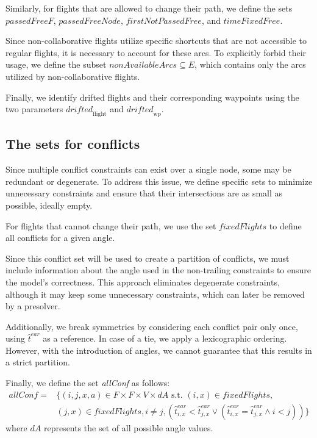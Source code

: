 \documentclass[../thesis.tex]{subfiles}
\begin{document}
Similarly, for flights that are allowed to change their path, we define the sets \( \textit{passedFreeF} \), \( \textit{passedFreeNode} \), \( \textit{firstNotPassedFree} \), and \( \textit{timeFixedFree} \).  

Since non-collaborative flights utilize specific shortcuts that are not accessible to regular flights, it is necessary to account for these arcs. 
To explicitly forbid their usage, we define the subset \( nonAvailableArcs \subseteq E \), which contains only the arcs utilized by non-collaborative flights.


Finally, we identify drifted flights and their corresponding waypoints using the two parameters \( \textit{drifted}_{\text{flight}} \) and \( \textit{drifted}_{\text{wp}} \).  


\subsection{The sets for conflicts}\label{sec:setConflict}

Since multiple conflict constraints can exist over a single node, some may be redundant or degenerate. To address this issue, we define specific sets to minimize unnecessary constraints and ensure that their intersections are as small as possible, ideally empty.

For flights that cannot change their path, we use the set $fixedFlights$ to define all conflicts for a given angle.

Since this conflict set will be used to create a partition of conflicts, we must include information about the angle used in the non-trailing constraints to ensure the model's correctness. This approach eliminates degenerate constraints, although it may keep some unnecessary constraints, which can later be removed by a presolver.

Additionally, we break symmetries by considering each conflict pair only once, using $\hat{t}^{ear}$ as a reference. In case of a tie, we apply a lexicographic ordering. However, with the introduction of angles, we cannot guarantee that this results in a strict partition.

Finally, we define the set \textit{allConf} as follows:
\begin{align}\label{eq:set:allConf}
    allConf = &\{(i,j,x,a) \in F\times F\times V\times dA \text{ s.t. }  
    (i,x) \in fixedFlights,\nonumber\\& (j,x) \in fixedFlights, i\neq j,  
    (\hat{t}^{ear}_{i,x} < \hat{t}^{ear}_{j,x} \lor (\hat{t}^{ear}_{i,x} = \hat{t}^{ear}_{j,x} \land i<j)) \}
\end{align}
where $dA$ represents the set of all possible angle values.
\end{document}
